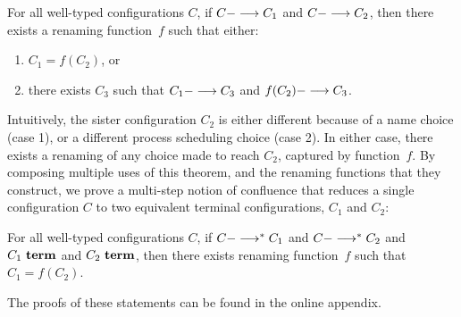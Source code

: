 \begin{theorem}
For all well-typed configurations $C$,
%
 if $C ---> C_1$ 
and $C ---> C_2$,
then 
there exists a renaming function~$f$ 
such that either:
\begin{enumerate}[leftmargin=*]
\item %
$C_1 = f(C_2)$,
or
\item there exists $C_3$ such that $C_1 ---> C_3$ and $f(C_2) ---> C_3$.
\end{enumerate}
\end{theorem}

Intuitively, the sister configuration $C_2$ is either different
because of a name choice (case 1), or a different process scheduling choice
(case 2).  In either case, there exists a renaming of any choice made
to reach $C_2$, captured by function~$f$.
%
By composing multiple uses of this theorem, and the renaming functions
that they construct, we prove a multi-step notion of confluence that 
reduces a single configuration $C$ to two equivalent terminal configurations,
 $C_1$ and $C_2$:

\begin{theorem}
For all well-typed configurations $C$,
%
 if $C --->^\ast C_1$ 
and $C --->^\ast C_2$ 
and $C_1~\textbf{term}$
and $C_2~\textbf{term}$,
then 
there exists renaming function~$f$ 
such that $C_1 = f(C_2)$.
\end{theorem}

The proofs of these statements can be found in the online appendix.
